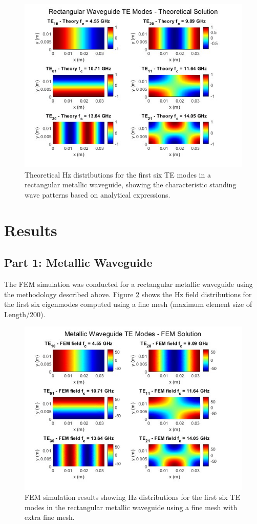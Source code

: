 \documentclass[10pt,letterpaper]{article}
\begin{document}
\begin{figure}[htbp]
    \centering
    \includegraphics[width=0.8\linewidth]{2.jpg}
    \caption{Theoretical Hz distributions for the first six TE modes in a rectangular metallic waveguide, showing the characteristic standing wave patterns based on analytical expressions.}
    \label{fig:theory_modes}
\end{figure}

\section*{Results}
\subsection*{Part 1: Metallic Waveguide}
The FEM simulation was conducted for a rectangular metallic 
waveguide using the methodology described above. Figure 
\ref{fig:mode_patterns} shows the Hz field distributions 
for the first six eigenmodes computed using a fine mesh 
(maximum element size of Length/200).

\begin{figure}[htbp]
    \centering
    \includegraphics[width=0.8\linewidth]{1.jpg}
    \caption{FEM simulation results showing Hz distributions for the first six TE modes in the rectangular metallic waveguide using a fine mesh with extra fine mesh.}
    \label{fig:mode_patterns}
\end{figure}
\end{document}
